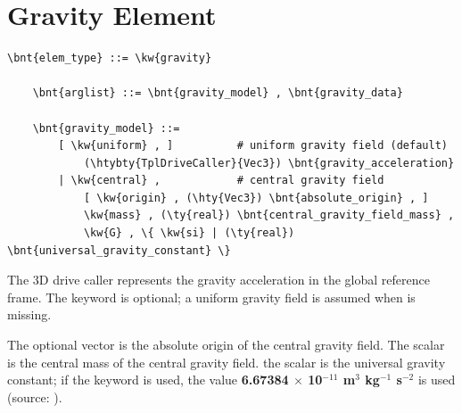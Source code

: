 \section{Gravity Element}
\label{sec:ELEMENTS:gravity}
\begin{Verbatim}[commandchars=\\\{\}]
    \bnt{elem_type} ::= \kw{gravity}

    \bnt{arglist} ::= \bnt{gravity_model} , \bnt{gravity_data}

    \bnt{gravity_model} ::=
        [ \kw{uniform} , ]          # uniform gravity field (default)
            (\htybty{TplDriveCaller}{Vec3}) \bnt{gravity_acceleration}
        | \kw{central} ,            # central gravity field
            [ \kw{origin} , (\hty{Vec3}) \bnt{absolute_origin} , ]
            \kw{mass} , (\ty{real}) \bnt{central_gravity_field_mass} ,
            \kw{G} , \{ \kw{si} | (\ty{real}) \bnt{universal_gravity_constant} \}
\end{Verbatim}
The 3D drive caller  represents
the gravity acceleration in the global reference frame.
The keyword  is optional; a uniform gravity field
is assumed when  is missing.

The optional vector  is the absolute origin of the central gravity field.
The scalar  is the central mass of the central gravity field.
the scalar  is the universal gravity constant;
if the keyword  is used, the value \textbf{6.67384 $\times$ 10$^{-11}$ m$^3$ kg$^{-1}$ s$^{-2}$} is used \\
(source: ).









